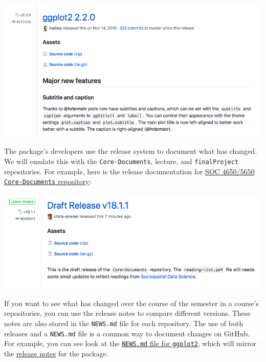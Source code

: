 \documentclass[]{book}
\theoremstyle{definition}
\theoremstyle{definition}
\theoremstyle{definition}
\theoremstyle{remark}
\begin{document}
\begin{center}\includegraphics[width=0.95\linewidth]{images/release} \end{center}

The package's developers use the release system to document what has
changed. We will emulate this with the \texttt{Core-Documents}, lecture,
and \texttt{finalProject} repositories. For example, here is the release
documentation for
\href{https://github.com/slu-soc5650/Core-Documents}{SOC 4650/5650
\texttt{Core-Documents} repository}:

\begin{center}\includegraphics[width=0.95\linewidth]{images/releaseEx} \end{center}

If you want to see what has changed over the course of the semester in a
course's repositories, you can use the release notes to compare
different versions. These notes are also stored in the \texttt{NEWS.md}
file for each repository. The use of both releases and a
\texttt{NEWS.md} file is a common way to document changes on GitHub. For
example, you can see look at the
\href{https://github.com/tidyverse/ggplot2/blob/master/NEWS.md}{\texttt{NEWS.md}
file for \texttt{ggplot2}}, which will mirror the
\href{https://github.com/tidyverse/ggplot2/releases}{release notes} for
the package.
\end{document}
